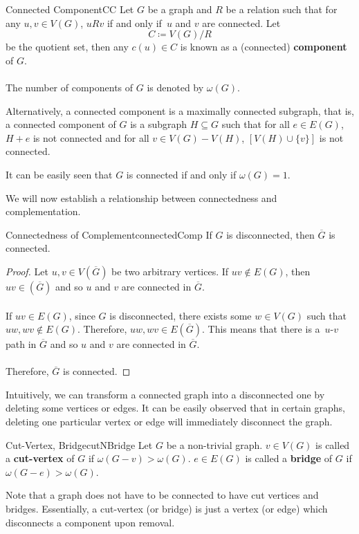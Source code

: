 \documentclass[math, code]{amznotes}
\theoremstyle{remark}
\begin{document}
\begin{dfnbox}{Connected Component}{CC}
    Let $G$ be a graph and $R$ be a relation such that for any $u, v \in V(G)$, $uRv$ if and only if~$u$ and $v$ are connected. Let
    \begin{equation*}
        C \coloneqq V(G)/R
    \end{equation*}
    be the quotient set, then any $c(u) \in C$ is known as a (connected) {\color{red} \textbf{component}} of $G$.
    \\\\
    The number of components of $G$ is denoted by $\omega(G)$.
\end{dfnbox}
Alternatively, a connected component is a maximally connected subgraph, that is, a connected component of $G$ is a subgraph $H \subseteq G$ such that for all $e \in E(G)$, $H + e$ is not connected and for all $v \in V(G) - V(H)$, $\left[V(H) \cup \{v\}\right]$ is not connected.

It can be easily seen that $G$ is connected if and only if $\omega(G) = 1$.

We will now establish a relationship between connectedness and complementation.
\begin{thmbox}{Connectedness of Complement}{connectedComp}
    If $G$ is disconnected, then $\overline{G}$ is connected.
    \tcblower
    \begin{proof}
        Let $u, v \in V\left(\overline{G}\right)$ be two arbitrary vertices. If $uv \notin E(G)$, then $uv \in \left(\overline{G}\right)$ and so $u$ and $v$ are connected in $\overline{G}$.
        \\\\
        If $uv \in E(G)$, since $G$ is disconnected, there exists some $w \in V(G)$ such that~$uw, wv \notin E(G)$. Therefore, $uw, wv \in E\left(\overline{G}\right)$. This means that there is a~$u$-$v$ path in $\overline{G}$ and so $u$ and $v$ are connected in $\overline{G}$.
        \\\\
        Therefore, $\overline{G}$ is connected.
    \end{proof}
\end{thmbox}
Intuitively, we can transform a connected graph into a disconnected one by deleting some vertices or edges. It can be easily observed that in certain graphs, deleting one particular vertex or edge will immediately disconnect the graph.
\begin{dfnbox}{Cut-Vertex, Bridge}{cutNBridge}
    Let $G$ be a non-trivial graph. $v \in V(G)$ is called a {\color{red} \textbf{cut-vertex}} of $G$ if $\omega(G - v) > \omega(G)$. $e \in E(G)$ is called a {\color{red} \textbf{bridge}} of $G$ if $\omega(G - e) > \omega(G)$.
\end{dfnbox}
Note that a graph does not have to be connected to have cut vertices and bridges. Essentially, a cut-vertex (or bridge) is just a vertex (or edge) which disconnects a component upon removal.
\end{document}
